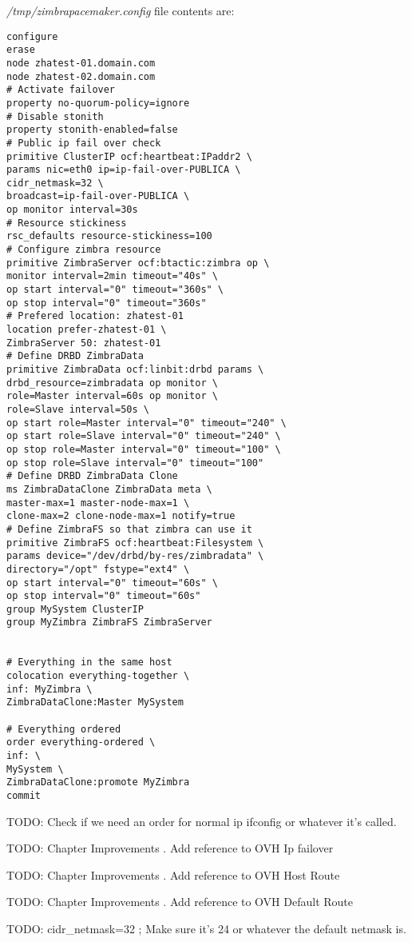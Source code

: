 \textit{/tmp/zimbrapacemaker.config} file contents are:
\begin{verbatim}
configure
erase
node zhatest-01.domain.com
node zhatest-02.domain.com
# Activate failover
property no-quorum-policy=ignore
# Disable stonith
property stonith-enabled=false
# Public ip fail over check
primitive ClusterIP ocf:heartbeat:IPaddr2 \
params nic=eth0 ip=ip-fail-over-PUBLICA \
cidr_netmask=32 \
broadcast=ip-fail-over-PUBLICA \
op monitor interval=30s
# Resource stickiness
rsc_defaults resource-stickiness=100
# Configure zimbra resource
primitive ZimbraServer ocf:btactic:zimbra op \
monitor interval=2min timeout="40s" \
op start interval="0" timeout="360s" \
op stop interval="0" timeout="360s"
# Prefered location: zhatest-01
location prefer-zhatest-01 \
ZimbraServer 50: zhatest-01
# Define DRBD ZimbraData
primitive ZimbraData ocf:linbit:drbd params \
drbd_resource=zimbradata op monitor \
role=Master interval=60s op monitor \
role=Slave interval=50s \
op start role=Master interval="0" timeout="240" \
op start role=Slave interval="0" timeout="240" \
op stop role=Master interval="0" timeout="100" \
op stop role=Slave interval="0" timeout="100"
# Define DRBD ZimbraData Clone
ms ZimbraDataClone ZimbraData meta \
master-max=1 master-node-max=1 \
clone-max=2 clone-node-max=1 notify=true
# Define ZimbraFS so that zimbra can use it
primitive ZimbraFS ocf:heartbeat:Filesystem \
params device="/dev/drbd/by-res/zimbradata" \
directory="/opt" fstype="ext4" \
op start interval="0" timeout="60s" \
op stop interval="0" timeout="60s"
group MySystem ClusterIP
group MyZimbra ZimbraFS ZimbraServer


# Everything in the same host
colocation everything-together \
inf: MyZimbra \
ZimbraDataClone:Master MySystem

# Everything ordered
order everything-ordered \
inf: \
MySystem \
ZimbraDataClone:promote MyZimbra
commit
\end{verbatim}

TODO: Check if we need an order for normal ip ifconfig or whatever it's called.

TODO: Chapter Improvements . Add reference to OVH Ip failover

TODO: Chapter Improvements . Add reference to OVH Host Route

TODO: Chapter Improvements . Add reference to OVH Default Route

TODO: cidr\_netmask=32 ; Make sure it's 24 or whatever the default netmask is.

